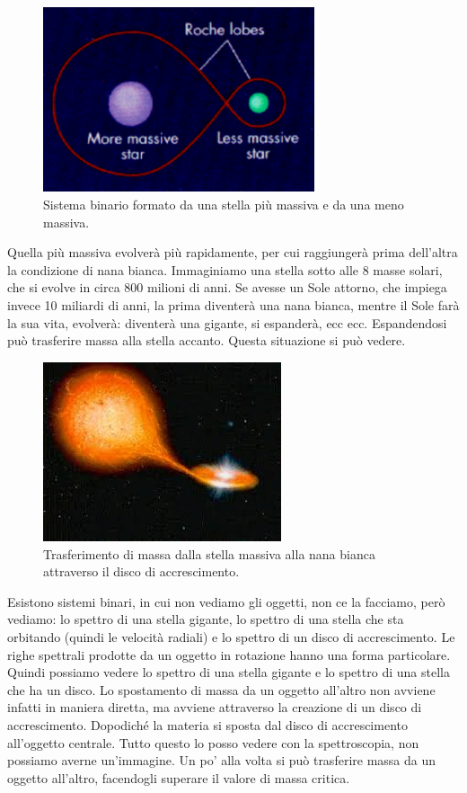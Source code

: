 \documentclass[a4paper,11pt]{article}
\begin{document}
\begin{figure}[h!!]
        \centering
        \includegraphics[width=8cm]{lezione 28 novembre/sistemabinario1.png}
        \caption{Sistema binario formato da una stella più massiva e da una meno massiva.}
        \label{lezione 28 novembre/sistemabinario1.png}
    \end{figure}
Quella più massiva evolverà più rapidamente, per cui raggiungerà prima dell'altra la condizione di nana bianca. Immaginiamo una stella sotto alle 8 masse solari, che si evolve in circa 800 milioni di anni. Se avesse un Sole attorno, che impiega invece 10 miliardi di anni, la prima diventerà una nana bianca, mentre il Sole farà la sua vita, evolverà: diventerà una gigante, si espanderà, ecc ecc. Espandendosi può trasferire massa alla stella accanto. Questa situazione si può vedere. 
\begin{figure}[h!!]
        \centering
        \includegraphics[width=7cm]{lezione 28 novembre/discoaccrescimento.png}
        \caption{Trasferimento di massa dalla stella massiva alla nana bianca attraverso il disco di accrescimento.}
        \label{lezione 28 novembre/discoaccrescimento.png}
    \end{figure}
Esistono sistemi binari, in cui non vediamo gli oggetti, non ce la facciamo, però vediamo: lo spettro di una stella gigante, lo spettro di una stella che sta orbitando (quindi le velocità radiali) e lo spettro di un disco di accrescimento. Le righe spettrali prodotte da un oggetto in rotazione hanno una forma particolare. Quindi possiamo vedere lo spettro di una stella gigante e lo spettro di una stella che ha un disco. Lo spostamento di massa da un oggetto all'altro non avviene infatti in maniera diretta, ma avviene attraverso la creazione di un disco di accrescimento. Dopodiché la materia si sposta dal disco di accrescimento all'oggetto centrale. Tutto questo lo posso vedere con la spettroscopia, non possiamo averne un'immagine. Un po' alla volta si può trasferire massa da un oggetto all'altro, facendogli superare il valore di massa critica. 
\end{document}
